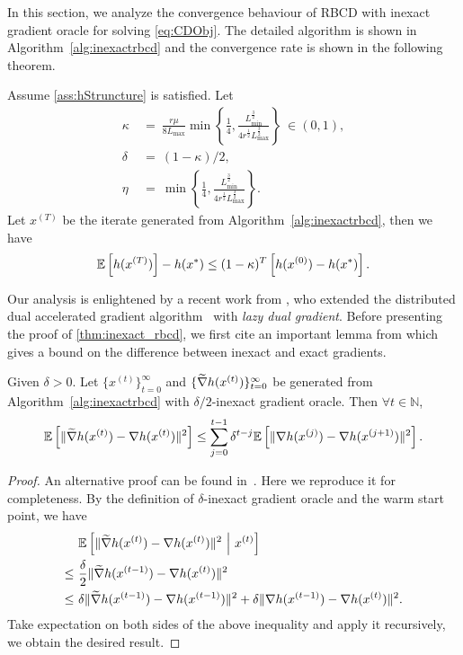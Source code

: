In this section, we analyze the convergence behaviour of RBCD with inexact gradient oracle for solving \eqref{eq:CDObj}. The detailed algorithm is shown in Algorithm~\ref{alg:inexactrbcd} and the convergence rate is shown in the following theorem. 
\begin{theorem} \label{thm:inexact_rbcd}
    Assume \autoref{ass:hStruncture} is satisfied. Let
    \begin{align}
        \kappa &~=~ \frac{ r \mu }{ 8 L_{\max}} \min \left\{ \frac{1}{4}, \frac{L_{\min}^{\frac{3}{2}}}{4 r^{\frac{1}{2}} L_{\max}^{\frac{3}{2}} } \right\} ~\in (0,1), \nonumber \\
        \delta &~=~ (1-\kappa) / 2, \nonumber \\
        \eta &~=~ \min \left\{ \frac{1}{4}, \frac{L_{\min}^{\frac{3}{2}}}{4 r^{\frac{1}{2}} L_{\max}^{\frac{3}{2}} } \right\}.
    \end{align} 
    Let $x^{(T)}$ be the iterate generated from Algorithm~\ref{alg:inexactrbcd}, then we have 
    \[\mathbb{E}\left[h(x^{(T)})\right] - h(x^*) \leq (1-\kappa)^T\left[h(x^{(0)}) - h(x^*) \right]. \]
\end{theorem}

Our analysis is enlightened by a recent work from \citet{LiuSY21}, who extended the distributed dual accelerated gradient algorithm~\citep{Scaman2017OptimalAF} with \emph{lazy dual gradient}. Before presenting the proof of \autoref{thm:inexact_rbcd}, we first cite an important lemma from \citep{LiuSY21} which gives a bound on the difference between inexact and exact gradients. 
\begin{lemma} \label{lemma:LiuLemma1}
    Given $\delta > 0$. Let $\{ x^{(t)} \}_{t=0}^{\infty}$ and $\{ \widetilde{\nabla} h(x^{(t)}) \}_{t=0}^{\infty}$ be generated from Algorithm~\ref{alg:inexactrbcd} with $\delta/2$-inexact gradient oracle. Then $\forall t \in \mathbb{N}$,
    \begin{align}
        \mathbb{E}\left[\| \widetilde{\nabla} h(x^{(t)}) - {\nabla} h(x^{(t)}) \|^2 \right] \leq \sum_{j=0}^{t-1} \delta^{t-j} \mathbb{E} \left[ \| \nabla h(x^{(j)}) - {\nabla} h(x^{(j+1)}) \|^2 \right]. \label{eq:recursiveGradDiff}
    \end{align}
\end{lemma}
\begin{proof}
An alternative proof can be found in~\citet[Appendix A]{LiuSY21}. Here we reproduce it for completeness. By the definition of $\delta$-inexact gradient oracle and the warm start point, we have
\begin{align*}
         &~\mathbb{E}\left[\| \widetilde{\nabla} h(x^{(t)}) - {\nabla} h(x^{(t)}) \|^2 ~\Big|~ x^{(t)} \right] \\
    \leq &~\frac{\delta}{2} \| \widetilde{\nabla} h(x^{(t-1)}) - {\nabla} h(x^{(t)}) \|^2 \\
    \leq &~\delta \| \widetilde{\nabla} h(x^{(t-1)}) - {\nabla} h(x^{(t-1)}) \|^2 + \delta \| {\nabla} h(x^{(t-1)}) - {\nabla} h(x^{(t)}) \|^2 .
\end{align*}
Take expectation on both sides of the above inequality and apply it recursively, we obtain the desired result.
\end{proof}

